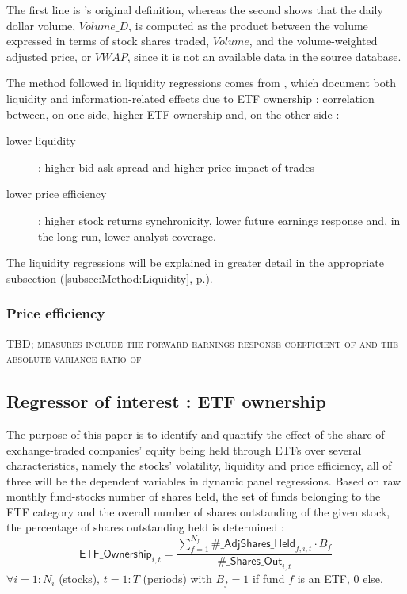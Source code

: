   The first line is \textcite{Amihud2002}'s original definition, whereas the second shows that the daily dollar volume, $Volume\_D$, is computed as the product between the volume expressed in terms of stock shares traded, $Volume$, and the volume-weighted adjusted price, or $VWAP$, since it is not an available data in the source database.
  
The method followed in liquidity regressions comes from \textcite{Israeli2017}, which document both liquidity and information-related effects due to ETF ownership : correlation between, on one side, higher ETF ownership  and, on the other side :
\begin{description}
\item[lower liquidity] : higher bid-ask spread and higher price impact of trades
\item[lower price efficiency] : higher stock returns synchronicity, lower future earnings response and, in the long run, lower analyst coverage.
\end{description}

The liquidity regressions will be explained in greater detail in the appropriate subsection (\autoref{subsec:Method:Liquidity}, p.\pageref{subsec:Method:Liquidity}).
\subsubsection{Price efficiency}
\begin{center}
  \textsc{TBD; measures include the forward earnings response coefficient of \textcite{Israeli2017} and the absolute variance ratio of \textcite{Ben-David2018}}
  \end{center}
\subsection{Regressor of interest : ETF ownership}
The purpose of this paper is to identify and quantify the effect of the share of exchange-traded companies' equity being held through ETFs over several characteristics, namely the stocks' volatility, liquidity and price efficiency, all of three will be the dependent variables in dynamic panel regressions. Based on raw monthly fund-stocks number of shares held, the set of funds belonging to the ETF category and the overall number of shares outstanding of the given stock, the percentage of shares outstanding held is determined :
\begin{equation}
  \mathsf{ETF\_Ownership}_{i, t} = \frac{\sum_{f = 1}^{N_{f}} \mathsf{\#\_AdjShares\_Held}_{f, i, t}\cdot B_{f}}{\mathsf{\#\_Shares\_Out}_{i, t}}
\end{equation}
$\forall i = 1:N_{i}$ (stocks), $t = 1:T$ (periods)
with $B_{f} = 1$ if fund $f$ is an ETF, $0$ else.

